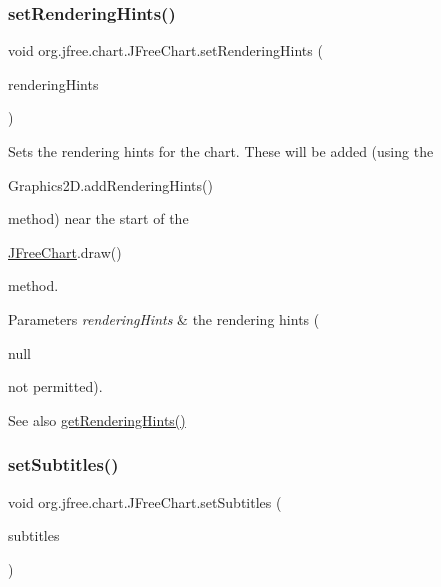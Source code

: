 \subsubsection{\texorpdfstring{set\+Rendering\+Hints()}{setRenderingHints()}}
{\footnotesize\ttfamily void org.\+jfree.\+chart.\+J\+Free\+Chart.\+set\+Rendering\+Hints (\begin{DoxyParamCaption}\item[{Rendering\+Hints}]{rendering\+Hints }\end{DoxyParamCaption})}

Sets the rendering hints for the chart. These will be added (using the 
\begin{DoxyCode}
Graphics2D.addRenderingHints() 
\end{DoxyCode}
 method) near the start of the 
\begin{DoxyCode}
\mbox{\hyperlink{classorg_1_1jfree_1_1chart_1_1_j_free_chart_a21ac385ae4cbb4cdea92b15732c3fadf}{JFreeChart}}.draw() 
\end{DoxyCode}
 method.


\begin{DoxyParams}{Parameters}
{\em rendering\+Hints} & the rendering hints (
\begin{DoxyCode}
null 
\end{DoxyCode}
 not permitted).\\
\hline
\end{DoxyParams}
\begin{DoxySeeAlso}{See also}
\mbox{\hyperlink{classorg_1_1jfree_1_1chart_1_1_j_free_chart_a5fc5f46f5bfff156c5ea85984a618f65}{get\+Rendering\+Hints()}} 
\end{DoxySeeAlso}
\mbox{\label{classorg_1_1jfree_1_1chart_1_1_j_free_chart_a8ead70270292a750391e3deec8a78d4f}} 
\subsubsection{\texorpdfstring{set\+Subtitles()}{setSubtitles()}}
{\footnotesize\ttfamily void org.\+jfree.\+chart.\+J\+Free\+Chart.\+set\+Subtitles (\begin{DoxyParamCaption}\item[{List}]{subtitles }\end{DoxyParamCaption})}

